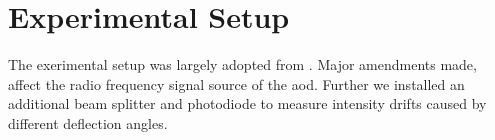 \chapter{Experimental Setup}

The exerimental setup was largely adopted from \cite{Hertlein2017}. Major
amendments made, affect the radio frequency signal source of the \gls{aod}.
Further we installed an additional beam splitter and photodiode to measure
intensity drifts caused by different deflection angles.
